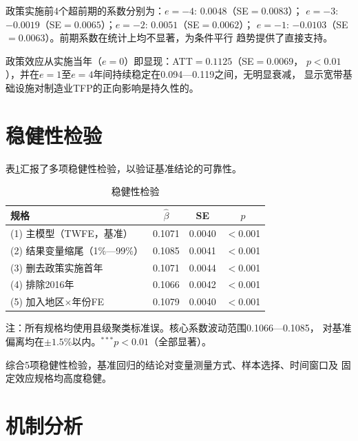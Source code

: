 \documentclass[12pt, a4paper]{article}
\begin{document}
政策实施前4个超前期的系数分别为：$e=-4$: $0.0048$（SE$=0.0083$）；
$e=-3$: $-0.0019$（SE$=0.0065$）；$e=-2$: $0.0051$（SE$=0.0062$）；
$e=-1$: $-0.0103$（SE$=0.0063$）。前期系数在统计上均不显著，为条件平行
趋势提供了直接支持。

政策效应从实施当年（$e=0$）即显现：ATT$=0.1125$（SE$=0.0069$，
$p<0.01$），并在$e=1$至$e=4$年间持续稳定在0.094—0.119之间，无明显衰减，
显示宽带基础设施对制造业TFP的正向影响是持久性的。

\section{稳健性检验}

表\ref{tab:robust}汇报了多项稳健性检验，以验证基准结论的可靠性。

\begin{table}[htbp]
\centering
\caption{稳健性检验}
\label{tab:robust}
\begin{threeparttable}
\begin{tabular}{lccc}
\toprule
规格 & $\hat\beta$ & SE & $p$ \\
\midrule
(1) 主模型（TWFE，基准） & 0.1071 & 0.0040 & $<$0.001 \\
(2) 结果变量缩尾（1\%—99\%） & 0.1085 & 0.0041 & $<$0.001 \\
(3) 删去政策实施首年 & 0.1071 & 0.0044 & $<$0.001 \\
(4) 排除2016年 & 0.1066 & 0.0042 & $<$0.001 \\
(5) 加入地区$\times$年份FE & 0.1079 & 0.0040 & $<$0.001 \\
\bottomrule
\end{tabular}
\begin{tablenotes}\small
\item 注：所有规格均使用县级聚类标准误。核心系数波动范围0.1066—0.1085，
  对基准偏离均在$\pm1.5\%$以内。$^{***}p<0.01$（全部显著）。
\end{tablenotes}
\end{threeparttable}
\end{table}

综合5项稳健性检验，基准回归的结论对变量测量方式、样本选择、时间窗口及
固定效应规格均高度稳健。

\section{机制分析}
\end{document}
